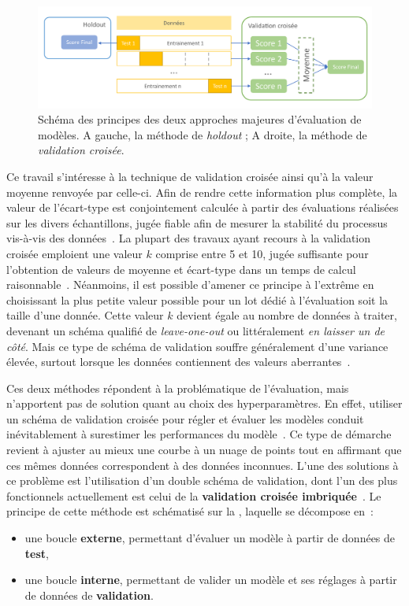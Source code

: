 \begin{figure}[H]
    \centering
    \includegraphics[width=\textwidth]{contents/chapter_3/resources/scheme_holdout_cv.pdf}
    \caption{Schéma des principes des deux approches majeures d'évaluation de modèles. A gauche, la méthode de \textit{holdout} ; A droite, la méthode de \textit{validation croisée}.}
    \label{fig:scheme_holdout_cv}
\end{figure}

Ce travail s'intéresse à la technique de validation croisée ainsi qu'à la valeur moyenne renvoyée par celle-ci. Afin de rendre cette information plus complète, la valeur de l'écart-type est conjointement calculée à partir des évaluations réalisées sur les divers échantillons, jugée fiable afin de mesurer la stabilité du processus vis-à-vis des données~\cite{Kim2009}. La plupart des travaux ayant recours à la validation croisée emploient une valeur $k$ comprise entre 5 et 10, jugée suffisante pour l'obtention de valeurs de moyenne et écart-type dans un temps de calcul raisonnable~\cite{James2000}. Néanmoins, il est possible d'amener ce principe à l'extrême en choisissant la plus petite valeur possible pour un lot dédié à l'évaluation soit la taille d'une donnée. Cette valeur $k$ devient égale au nombre de données à traiter, devenant un schéma qualifié de \textit{leave-one-out} ou littéralement \textit{en laisser un de côté}. Mais ce type de schéma de validation souffre généralement d'une variance élevée, surtout lorsque les données contiennent des valeurs aberrantes~\cite{Bengio2004}.\par

Ces deux méthodes répondent à la problématique de l'évaluation, mais n'apportent pas de solution quant au choix des hyperparamètres. En effet, utiliser un schéma de validation croisée pour régler et évaluer les modèles conduit inévitablement à surestimer les performances du modèle~\cite{Tsamardinos2014}. Ce type de démarche revient à ajuster au mieux une courbe à un nuage de points tout en affirmant que ces mêmes données correspondent à des données inconnues. L'une des solutions à ce problème est l'utilisation d'un double schéma de validation, dont l'un des plus fonctionnels actuellement est celui de la \textbf{validation croisée imbriquée}~\cite{Cawley2010}. Le principe de cette méthode est schématisé sur la , laquelle se décompose en~:
\begin{itemize}
    \item une boucle \textbf{externe}, permettant d'évaluer un modèle à partir de données de \textbf{test},
    \item une boucle \textbf{interne}, permettant de valider un modèle et ses réglages à partir de données de \textbf{validation}.
\end{itemize}\par
  
